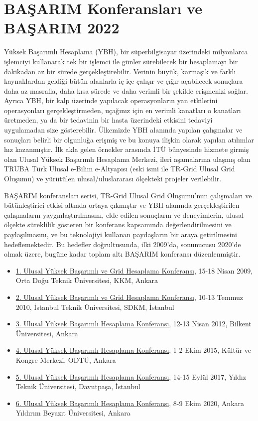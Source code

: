 \section{BAŞARIM Konferansları ve BAŞARIM 2022}

Yüksek Başarımlı Hesaplama (YBH), bir süperbilgisayar üzerindeki milyonlarca işlemciyi kullanarak tek bir işlemci ile günler sürebilecek bir hesaplamayı bir dakikadan az bir sürede gerçekleştirebilir. Verinin büyük, karmaşık ve farklı kaynaklardan geldiği bütün alanlarla iç içe çalışır ve çığır açabilecek sonuçlara daha az masrafla, daha kısa sürede ve daha verimli bir şekilde erişmenizi sağlar. Ayrıca YBH, bir kalp üzerinde yapılacak operasyonların yan etkilerini operasyonları gerçekleştirmeden, uçağınız için en verimli kanatları o kanatları üretmeden, ya da bir tedavinin bir hasta üzerindeki etkisini tedaviyi uygulamadan size gösterebilir.
Ülkemizde YBH alanında yapılan çalışmalar ve sonuçları belirli bir olgunluğa erişmiş ve bu konuya ilişkin olarak yapılan atılımlar hız kazanmıştır.
İlk akla gelen örnekler arasında İTÜ bünyesinde hizmete girmiş olan Ulusal Yüksek Başarımlı Hesaplama Merkezi,
ileri aşamalarına ulaşmış olan TRUBA Türk Ulusal e-Bilim e-Altyapısı (eski ismi ile TR-Grid Ulusal Grid Oluşumu) ve yürütülen ulusal/uluslararası ölçekteki projeler verilebilir.

BAŞARIM konferansları serisi, TR-Grid Ulusal Grid Oluşumu'nun çalışmaları ve bütünleştirici etkisi altında ortaya çıkmıştır ve
YBH alanında gerçekleştirilen çalışmaların yaygınlaştırılmasını, elde edilen sonuçların ve deneyimlerin, ulusal ölçekte süreklilik gösteren
bir konferans kapsamında değerlendirilmesini ve paylaşılmasını, ve bu teknolojiyi kullanan paydaşların bir araya getirilmesini
hedeflemektedir. Bu hedefler doğrultusunda, ilki 2009'da, sonunucusu 2020'de olmak üzere, bugüne kadar toplam altı BAŞARIM konferansı düzenlenmiştir.

\begin{itemize}
    \setlength{\itemsep}{0pt}
  \setlength{\parskip}{0pt}
\item \href{http://basarim09.ceng.metu.edu.tr/}{1. Ulusal Yüksek Başarımlı ve Grid Hesaplama Konferansı}, 15-18 Nisan 2009, Orta Doğu Teknik Üniversitesi, KKM, Ankara
\item \href{https://www.basarim.org.tr/2010/}{2. Ulusal Yüksek Başarımlı ve Grid Hesaplama Konferansı}, 10-13 Temmuz 2010, İstanbul Teknik Üniversitesi, SDKM, İstanbul
\item \href{https://www.basarim.org.tr/2012/}{3. Ulusal Yüksek Başarımlı Hesaplama Konferansı}, 12-13 Nisan 2012, Bilkent Üniversitesi, Ankara
\item \href{https://www.basarim.org.tr/2015/}{4. Ulusal Yüksek Başarımlı Hesaplama Konferansı}, 1-2 Ekim 2015, Kültür ve Kongre Merkezi, ODTÜ, Ankara
\item \href{https://www.basarim.org.tr/2017/}{5. Ulusal Yüksek Başarımlı Hesaplama Konferansı}, 14-15 Eylül 2017, Yıldız Teknik Üniversitesi, Davutpaşa, İstanbul
\item \href{https://www.basarim.org.tr/2020/}{6. Ulusal Yüksek Başarımlı Hesaplama Konferansı}, 8-9 Ekim 2020, Ankara Yıldırım Beyazıt Üniversitesi, Ankara
\end{itemize}

